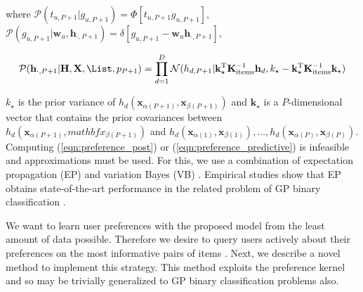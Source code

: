where $\mathcal{P}(t_{u,P+1}|g_{u,P+1})=\Phi[t_{u,P+1}g_{u,P+1}]$, $\mathcal{P}(g_{u,P+1}|\mathbf{w}_u,\mathbf{h}_{\cdot,P+1})=\delta[ g_{u,P+1} - \mathbf{w}_u \mathbf{h}_{\cdot,P+1}]$,

\begin{equation}
	\mathcal{P}(\mathbf{h}_{\cdot,P+1}|\mathbf{H},\mathbf{X},\List,p_{P+1})
	=\prod_{d=1}^D \mathcal{N}(h_{d,P+1}|\mathbf{k}_\star^\text{T} \mathbf{K}^{-1}_\text{items} \mathbf{h}_d, k_\star -
	\mathbf{k}_\star^\text{T}  \mathbf{K}^{-1}_\text{items} \mathbf{k}_\star)
	\label{eqn:preference_predictive}
\end{equation}

$k_\star$ is the prior variance of $h_d(\mathbf{x}_{\alpha(P+1)}, \mathbf{x}_{\beta(P+1)})$ and $\mathbf{k}_\star$ is a $P$-dimensional vector that contains the prior covariances between $h_d(\mathbf{x}_{\alpha(P+1)},  mathbf{x}_{\beta(P+1)})$ and $h_d(\mathbf{x}_{\alpha(1)}, \mathbf{x}_{\beta(1)}),\ldots,h_d(\mathbf{x}_{\alpha(P)}, \mathbf{x}_{\beta(P)})$. Computing (\ref{eqn:preference_post}) or (\ref{eqn:preference_predictive}) is infeasible and approximations must be used. For this, we use a combination of expectation propagation (EP) \citep{Minka2001} and variation Bayes (VB) \citep{Ghahramani2001}. Empirical studies show that EP obtains state-of-the-art performance  in the related problem of GP binary classification \citep{Nickisch2008}.

We want to learn user preferences with the proposed model from the least amount of data possible. Therefore we desire to query users actively about their preferences on the most informative pairs of items \citep{Brochu2007active}. Next, we describe a novel method to implement this strategy. This method exploits the preference kernel and so may be trivially generalized to GP binary classification problems also.


